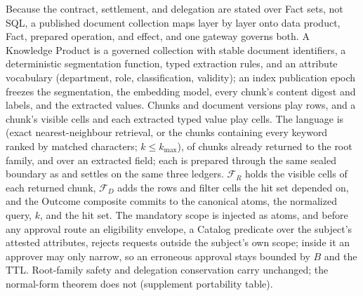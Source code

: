 \documentclass[10pt,journal,compsoc]{IEEEtran}
\newcommand{\code}[1]{\texttt{\detokenize{#1}}}
\newcommand{\facts}{\mathcal{F}}
\begin{document}
Because the contract, settlement, and delegation are stated over Fact sets,
not SQL, a published document collection maps layer by layer onto data
product, Fact, prepared operation, and effect, and one gateway governs
both. A Knowledge
Product is a governed collection with stable document identifiers, a
deterministic segmentation function, typed extraction rules, and an
attribute vocabulary (department, role, classification, validity); an index
publication epoch freezes the segmentation, the embedding model, every
chunk's content digest and labels, and the extracted values. Chunks and
document versions play rows, and a chunk's visible cells and each extracted
typed value play cells. The language is \code{search} (exact nearest-neighbour
retrieval, or the chunks containing every keyword ranked by matched
characters; $k\le k_{\max}$), \code{fetch} of chunks already returned to
the root family, and \code{aggregate} over an extracted field; each is
prepared through the same sealed boundary as \code{execute_plan} and settles
on the same three ledgers. $\facts_R$ holds the visible cells of each
returned chunk, $\facts_D$ adds the rows and filter cells the hit set
depended on, and the Outcome composite commits to the canonical atoms, the
normalized query, $k$, and the hit set. The mandatory scope is injected as
atoms, and before any approval route an eligibility envelope, a Catalog
predicate over the subject's attested attributes, rejects requests outside
the subject's own scope; inside it an approver may only narrow, so an
erroneous approval stays bounded by $B$ and the TTL. Root-family safety and
delegation conservation carry unchanged; the normal-form theorem does not
(supplement portability table).
\end{document}
